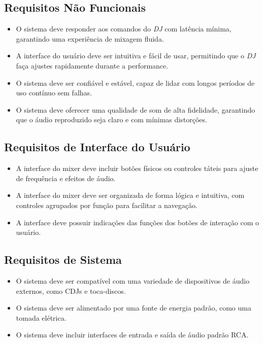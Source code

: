 \subsection{Requisitos Não Funcionais}
\begin{itemize}
    \item O sistema deve responder aos comandos do \textit{DJ} com latência mínima, garantindo uma experiência de mixagem fluida.
    \item A interface do usuário deve ser intuitiva e fácil de usar, permitindo que o \textit{DJ} faça ajustes rapidamente durante a performance.
    \item O sistema deve ser confiável e estável, capaz de lidar com longos períodos de uso contínuo sem falhas.
    \item O sistema deve oferecer uma qualidade de som de alta fidelidade, garantindo que o áudio reproduzido seja claro e com mínimas distorções.
\end{itemize}

\subsection{Requisitos de Interface do Usuário}
\begin{itemize}
    \item A interface do mixer deve incluir botões físicos ou controles táteis para ajuste de frequência e efeitos de áudio.
    \item A interface do mixer deve ser organizada de forma lógica e intuitiva, com controles agrupados por função para facilitar a navegação.
    \item A interface deve possuir indicações das funções dos botões de interação com o usuário.
\end{itemize}

\subsection{Requisitos de Sistema}
\begin{itemize}
    \item O sistema deve ser compatível com uma variedade de dispositivos de áudio externos, como CDJs e toca-discos.
    \item O sistema deve ser alimentado por uma fonte de energia padrão, como uma tomada elétrica.
    \item O sistema deve incluir interfaces de entrada e saída de áudio padrão RCA.
\end{itemize}

